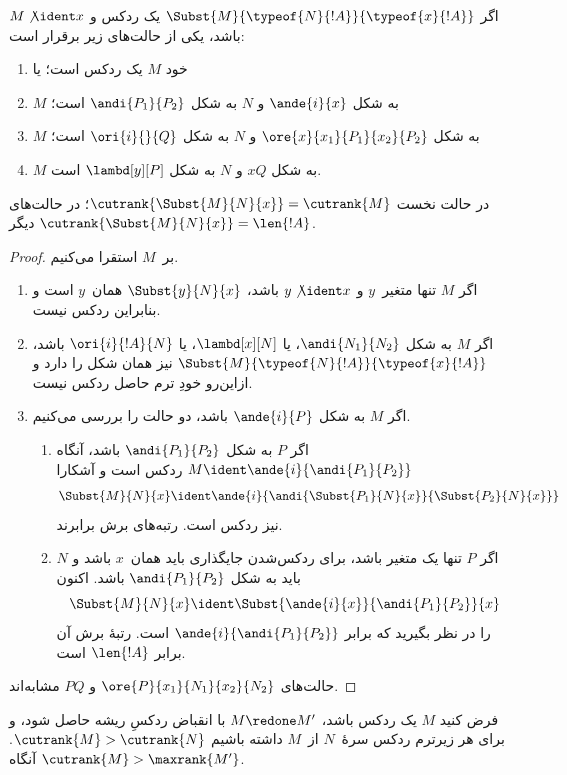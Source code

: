 \documentclass[../../../include/open-logic-section]{subfiles}
\begin{document}
\begin{lem}
  اگر $\Subst{M}{\typeof{N}{!A}}{\typeof{x}{!A}}$ یک ردکس و
  $M \not\ident x$ باشد، یکی از حالت‌های زیر برقرار است:
  \begin{enumerate}
  \item خود $M$ یک ردکس است؛ یا
  \item $M$ به شکل $\ande{i}{x}$ و $N$ به شکل
    $\andi{P_1}{P_2}$ است؛
  \item $M$ به شکل $\ore{x}{x_1}{P_1}{x_2}{P_2}$ و $N$ به شکل
    $\ori{i}{}{Q}$ است؛
  \item $M$ به شکل $x Q$ و $N$ به شکل $\lambd[y][P]$ است.
  \end{enumerate}
  در حالت نخست
  $\cutrank{\Subst{M}{N}{x}} = \cutrank{M}$؛ در حالت‌های دیگر
  $\cutrank{\Subst{M}{N}{x}} = \len{!A}$.
\end{lem}
\begin{proof}
  بر~$M$ استقرا می‌کنیم.
  \begin{enumerate}
  \item اگر $M$ تنها متغیر~$y$ و $y \not\ident x$ باشد،
    $\Subst{y}{N}{x}$ همان~$y$ است و بنابراین ردکس نیست.
  \item اگر $M$ به شکل $\andi{N_1}{N_2}$، یا $\lambd[x][N]$، یا
    $\ori{i}{!A}{N}$ باشد،
    $\Subst{M}{\typeof{N}{!A}}{\typeof{x}{!A}}$ نیز همان شکل را دارد
    و ازاین‌رو خودِ ترم حاصل ردکس نیست.
  \item اگر $M$ به شکل $\ande{i}{P}$ باشد، دو حالت را بررسی می‌کنیم.
    \begin{enumerate}
      \item اگر $P$ به شکل $\andi{P_1}{P_2}$ باشد، آنگاه
        $M \ident \ande{i}{\andi{P_1}{P_2}}$ ردکس است و آشکارا
        \[
        \Subst{M}{N}{x} \ident
        \ande{i}{\andi{\Subst{P_1}{N}{x}}{\Subst{P_2}{N}{x}}}
        \]
        نیز ردکس است. رتبه‌های برش برابرند.
      \item اگر $P$ تنها یک متغیر باشد، برای ردکس‌شدن جایگذاری باید
        همان~$x$ باشد و $N$ باید به شکل $\andi{P_1}{P_2}$ باشد. اکنون
        \[
        \Subst{M}{N}{x} \ident \Subst{\ande{i}{x}}{\andi{P_1}{P_2}}{x}
        \]
        را در نظر بگیرید که برابر $\ande{i}{\andi{P_1}{P_2}}$ است.
        رتبهٔ برش آن برابر $\len{!A}$ است.
    \end{enumerate}
  \end{enumerate}
  حالت‌های $\ore{P}{x_1}{N_1}{x_2}{N_2}$ و $P Q$ مشابه‌اند.
\end{proof}

\begin{lem}
  فرض کنید $M$ یک ردکس باشد، $M \redone M'$ با انقباض ردکسِ ریشه
  حاصل شود، و برای هر زیرترم ردکس سرهٔ~$N$ از~$M$ داشته باشیم
  $\cutrank{M} > \cutrank{N}$. آنگاه
  $\cutrank{M} > \maxrank{M'}$.
\end{lem}
\end{document}
